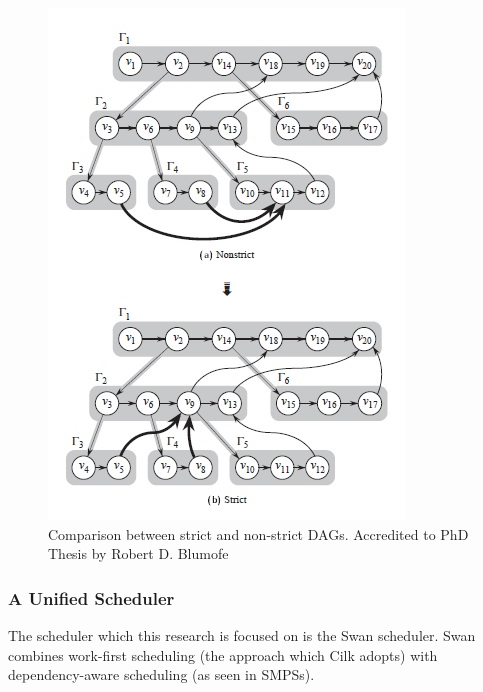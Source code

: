 \begin{figure} [tp]
	\centering
	\includegraphics [width=1\linewidth]{img/dagcompare.jpg}
	\caption{Comparison between strict and non-strict DAGs. Accredited to PhD Thesis by Robert D. Blumofe \citep{id13}}
	\label{strictdag}
\end{figure}

\subsubsection{A Unified Scheduler}
\label{section:swan}

The scheduler which this research is focused on is the Swan scheduler. Swan combines work-first scheduling (the approach which Cilk adopts) with dependency-aware scheduling (as seen in SMPSs).


